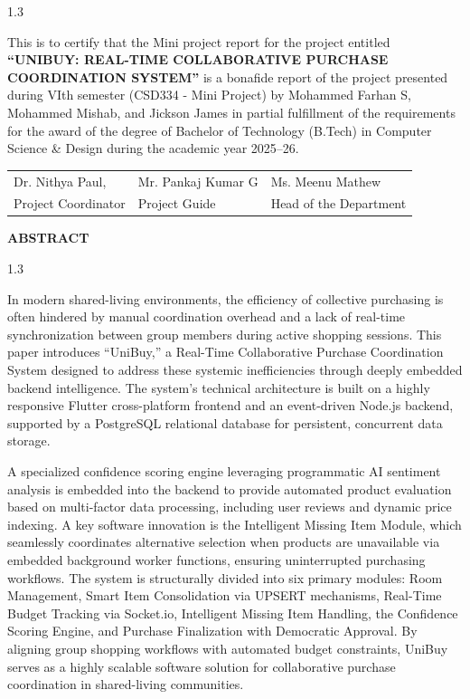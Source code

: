 \documentclass[a4paper,12pt]{article}
\begin{document}
\small
\begin{spacing}{1.3}

\noindent
This is to certify that the Mini project report for the project entitled \textbf{``UNIBUY: REAL-TIME COLLABORATIVE PURCHASE COORDINATION SYSTEM''} is a bonafide report of the project presented during VIth semester (CSD334 - Mini Project) by Mohammed Farhan S, Mohammed Mishab, and Jickson James in partial fulfillment of the requirements for the award of the degree of Bachelor of Technology (B.Tech) in Computer Science \& Design during the academic year 2025--26.

\vspace{2cm}
\noindent
\begin{tabular}{p{}p{}p{}}
Dr. Nithya Paul, & Mr. Pankaj Kumar G & Ms. Meenu Mathew  \\
Project Coordinator & Project Guide & Head of the Department \\
\end{tabular}
\end{spacing}

\newpage
\thispagestyle{empty}
\begin{center}
{\LARGE \textbf{ABSTRACT}}\\[1cm]
\end{center}
\begin{spacing}{1.3}

In modern shared-living environments, the efficiency of collective purchasing is often hindered by manual coordination overhead and a lack of real-time synchronization between group members during active shopping sessions. This paper introduces ``UniBuy,'' a Real-Time Collaborative Purchase Coordination System designed to address these systemic inefficiencies through deeply embedded backend intelligence. The system's technical architecture is built on a highly responsive Flutter cross-platform frontend and an event-driven Node.js backend, supported by a PostgreSQL relational database for persistent, concurrent data storage.

A specialized confidence scoring engine leveraging programmatic AI sentiment analysis is embedded into the backend to provide automated product evaluation based on multi-factor data processing, including user reviews and dynamic price indexing. A key software innovation is the Intelligent Missing Item Module, which seamlessly coordinates alternative selection when products are unavailable via embedded background worker functions, ensuring uninterrupted purchasing workflows. The system is structurally divided into six primary modules: Room Management, Smart Item Consolidation via UPSERT mechanisms, Real-Time Budget Tracking via Socket.io, Intelligent Missing Item Handling, the Confidence Scoring Engine, and Purchase Finalization with Democratic Approval. By aligning group shopping workflows with automated budget constraints, UniBuy serves as a highly scalable software solution for collaborative purchase coordination in shared-living communities.
\end{spacing}
\end{document}

